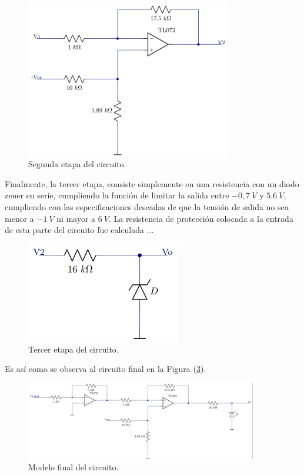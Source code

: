 \documentclass[a4paper]{article}
\begin{document}
\begin{figure}[H]
	\centering
	\includegraphics[width=0.8\textwidth]{Ejercicio6/Imagenes/CircuitoEtapa2-M1.png}
	\caption{Segunda etapa del circuito.}
	\label{fig:cir2-M1}
\end{figure}

Finalmente, la tercer etapa, consiste simplemente en una resistencia con un diodo zener en serie, cumpliendo la función de limitar la salida entre $-0,7 \ V$ y $5.6 \ V$, cumpliendo con las especificaciones deseadas de que la tensión de salida no sea menor a $-1 \ V$ ni mayor a $6 \ V$. La resistencia de protección colocada a la entrada de esta parte del circuito fue calculada ...

\begin{figure}[H]
	\centering
	\includegraphics[width=0.6\textwidth]{Ejercicio6/Imagenes/CircuitoEtapa3-M1.png}
	\caption{Tercer etapa del circuito.}
	\label{fig:cir3}
\end{figure}

Es así como se observa al circuito final en la Figura (\ref{fig:cirfin-M1}).

\begin{figure}[H]
	\centering
	\includegraphics[width=0.9\textwidth]{Ejercicio6/Imagenes/CircuitoFinal-M1.png}
	\caption{Modelo final del circuito.}
	\label{fig:cirfin-M1}
\end{figure}
\end{document}
